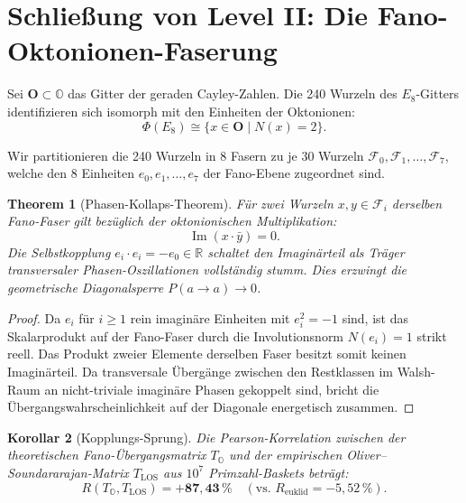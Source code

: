 \documentclass[11pt,a4paper]{article}
\newtheorem{theorem}{Theorem}[section]
\newtheorem{corollary}[theorem]{Korollar}
\begin{document}
\section{Schließung von Level II: Die Fano-Oktonionen-Faserung}

Sei $\mathbf{O} \subset \mathbb{O}$ das Gitter der geraden Cayley-Zahlen. Die 240 Wurzeln des $E_8$-Gitters identifizieren sich isomorph mit den Einheiten der Oktonionen:
\begin{equation}
\Phi(E_8) \cong \{ x \in \mathbf{O} \mid N(x) = 2 \}.
\end{equation}

Wir partitionieren die 240 Wurzeln in 8 Fasern zu je 30 Wurzeln $\mathcal{F}_0, \mathcal{F}_1, \dots, \mathcal{F}_7$, welche den 8 Einheiten $e_0, e_1, \dots, e_7$ der Fano-Ebene zugeordnet sind.

\begin{theorem}[Phasen-Kollaps-Theorem]
Für zwei Wurzeln $x, y \in \mathcal{F}_i$ derselben Fano-Faser gilt bezüglich der oktonionischen Multiplikation:
\begin{equation}
\operatorname{Im}(x \cdot \bar{y}) = 0.
\end{equation}
Die Selbstkopplung $e_i \cdot e_i = -e_0 \in \mathbb{R}$ schaltet den Imaginärteil als Träger transversaler Phasen-Oszillationen vollständig stumm. Dies erzwingt die geometrische Diagonalsperre $P(a \to a) \to 0$.
\end{theorem}

\begin{proof}
Da $e_i$ für $i \ge 1$ rein imaginäre Einheiten mit $e_i^2 = -1$ sind, ist das Skalarprodukt auf der Fano-Faser durch die Involutionsnorm $N(e_i) = 1$ strikt reell. Das Produkt zweier Elemente derselben Faser besitzt somit keinen Imaginärteil. Da transversale Übergänge zwischen den Restklassen im Walsh-Raum an nicht-triviale imaginäre Phasen gekoppelt sind, bricht die Übergangswahrscheinlichkeit auf der Diagonale energetisch zusammen.
\end{proof}

\begin{corollary}[Kopplungs-Sprung]
Die Pearson-Korrelation zwischen der theoretischen Fano-Übergangsmatrix $T_{\mathbb{O}}$ und der empirischen Oliver--Soundararajan-Matrix $T_{\text{LOS}}$ aus $10^7$ Primzahl-Baskets beträgt:
\begin{equation}
R(T_{\mathbb{O}}, T_{\text{LOS}}) = \mathbf{+87{,}43\,\%} \quad (\text{vs. } R_{\text{euklid}} = -5{,}52\,\%).
\end{equation}
\end{corollary}
\end{document}
